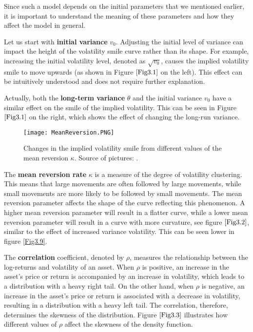 \documentclass[12pt,a4paper]{report}
\theoremstyle{definition}
\begin{document}
Since such a model depends on the initial parameters that we mentioned earlier, it is important to understand the meaning of these parameters and how they affect the model in general.

Let us start with \textbf{initial variance }$v_0$. Adjusting the initial level of variance can impact the height of the volatility smile curve rather than its shape. For example, increasing the initial volatility level, denoted as $\sqrt{v_0}$, causes the implied volatility smile to move upwards (as shown in Figure $\ref{Fig3.1}$ on the left). This effect can be intuitively understood and does not require further explanation.

Actually, both the \textbf{long-term variance} $\theta$ and the initial variance $v_0$ have a similar effect on the smile of the implied volatility. This can be seen in Figure $\ref{Fig3.1}$ on the right, which shows the effect of changing the long-run variance.

\begin{figure}[!htbp]
	\centering
	\texttt{[image: MeanReversion.PNG]}
	\caption{Changes in the implied volatility smile from different values of the mean reversion $\kappa$. Source of pictures: \parencite{gauthier2009fitting}.}
	\label{Fig3.2}
\end{figure}

The \textbf{mean reversion rate} $\kappa$ is a measure of the degree of volatility clustering. This means that large movements are often followed by large movements, while small movements are more likely to be followed by small movements. The mean reversion parameter affects the shape of the curve reflecting this phenomenon. A higher mean reversion parameter will result in a flatter curve, while a lower mean reversion parameter will result in a curve with more curvature, see figure $\ref{Fig3.2}$, similar to the effect of increased variance volatility. This can be seen lower in figure \ref{Fig3.9}.



The \textbf{correlation} coefficient, denoted by $\rho$, measures the relationship between the log-returns and volatility of an asset. When $\rho$ is positive, an increase in the asset's price or return is accompanied by an increase in volatility, which leads to a distribution with a heavy right tail. On the other hand, when $\rho$ is negative, an increase in the asset's price or return is associated with a decrease in volatility, resulting in a distribution with a heavy left tail. The correlation, therefore, determines the skewness of the distribution. Figure $\ref{Fig3.3}$ illustrates how different values of $\rho$ affect the skewness of the density function.
\end{document}
